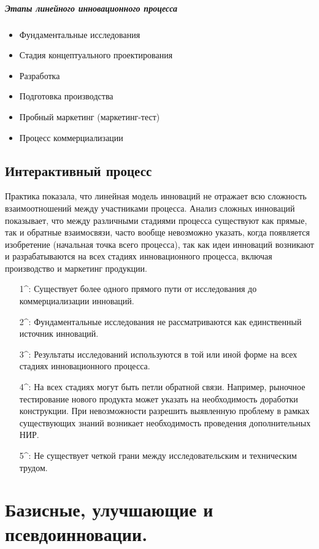 \documentclass[11pt]{article}
\theoremstyle{plain} %
\theoremstyle{definition} %
\theoremstyle{remark} %
\begin{document}
\subparagraph{Этапы линейного инновационного процесса}

\begin{itemize}
	\item Фундаментальные исследования
	\item Стадия концептуального проектирования
	\item Разработка
	\item Подготовка производства
	\item Пробный маркетинг (маркетинг-тест)
	\item Процесс коммерциализации
\end{itemize}

\subsection{Интерактивный процесс}

Практика показала, что линейная модель инноваций не отражает всю сложность взаимоотношений между участниками процесса. Анализ сложных инноваций показывает, что между различными стадиями процесса существуют как прямые, так и обратные взаимосвязи, часто вообще невозможно указать, когда появляется изобретение (начальная точка всего процесса), так как идеи инноваций возникают и разрабатываются на всех стадиях инновационного процесса, включая производство и маркетинг продукции.

\begin{itemize}
	\item[1^{\circ}:] Существует более одного прямого пути от исследования до коммерциализации инноваций.
	\item[2^{\circ}:] Фундаментальные исследования не рассматриваются как единственный источник инноваций.
	\item[3^{\circ}:] Результаты исследований используются в той или иной форме на всех стадиях инновационного процесса.
	\item[4^{\circ}:] На всех стадиях могут быть петли обратной связи. Например, рыночное тестирование нового продукта может указать на необходимость доработки конструкции. При невозможности разрешить выявленную проблему в рамках существующих знаний возникает необходимость проведения дополнительных НИР.
	\item[5^{\circ}:] Не существует четкой грани между исследовательским и техническим трудом.
\end{itemize}
\newpage

\section{Базисные, улучшающие и псевдоинновации.}\label{erste}
\end{document}

